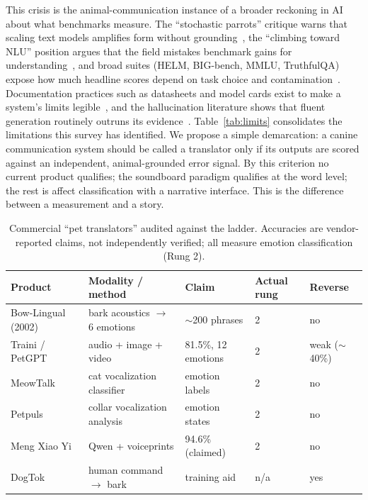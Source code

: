 This crisis is the animal-communication instance of a broader reckoning in
AI about what benchmarks measure. The ``stochastic parrots'' critique warns
that scaling text models amplifies form without
grounding~\cite{bender2021parrots}, the ``climbing toward NLU'' position
argues that the field mistakes benchmark gains for
understanding~\cite{bender2020climbing}, and broad suites (HELM, BIG-bench,
MMLU, TruthfulQA) expose how much headline scores depend on task choice and
contamination~\cite{liang2023helm,srivastava2023bigbench,hendrycks2021mmlu,lin2022truthfulqa}.
Documentation practices such as datasheets and model cards exist to make a
system's limits legible~\cite{gebru2021datasheets,mitchell2019modelcards},
and the hallucination literature shows that fluent generation routinely
outruns its evidence~\cite{ji2023hallucination,maynez2020faithfulness}.
Table~\ref{tab:limits} consolidates the limitations this survey has
identified. We propose a simple demarcation: a canine communication system
should be called a translator only if its outputs are scored against an
independent, animal-grounded error signal. By this criterion no current
product qualifies; the soundboard paradigm qualifies at the word level; the
rest is affect classification with a narrative interface. This is the
difference between a measurement and a story.

\begin{table}[htbp]
\centering
\caption{Commercial ``pet translators'' audited against the ladder.
Accuracies are vendor-reported claims, not independently verified; all
measure emotion classification (Rung 2).}
\label{tab:products}
\footnotesize
\setlength{\tabcolsep}{4pt}
\begin{tabular}{@{}p{2.5cm}p{3.5cm}p{2.6cm}p{2.0cm}p{2.2cm}@{}}
\toprule
\textbf{Product} & \textbf{Modality / method} & \textbf{Claim} & \textbf{Actual rung} & \textbf{Reverse} \\
\midrule
Bow-Lingual (2002)~\cite{bowlingual2002} & bark acoustics $\to$ 6 emotions & $\sim$200 phrases & 2 & no \\
Traini / PetGPT~\cite{traini2024} & audio + image + video & 81.5\%, 12 emotions & 2 & weak ($\sim$40\%) \\
MeowTalk~\cite{meowtalk2020} & cat vocalization classifier & emotion labels & 2 & no \\
Petpuls~\cite{petpuls2021} & collar vocalization analysis & emotion states & 2 & no \\
Meng Xiao Yi~\cite{mengxiaoyi2026} & Qwen + voiceprints & 94.6\% (claimed) & 2 & no \\
DogTok & human command $\to$ bark & training aid & n/a & yes \\
\bottomrule
\end{tabular}
\end{table}

